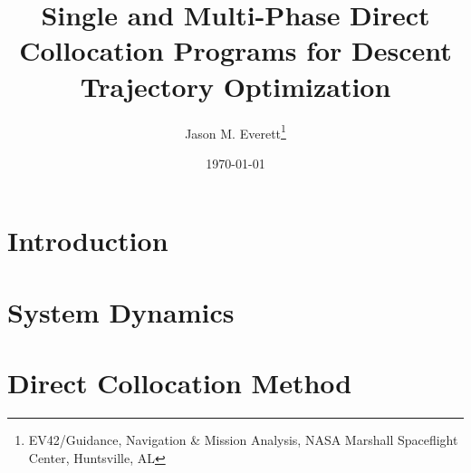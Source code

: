 \documentclass[10pt]{article}
\begin{document}
\title{\textbf{Single and Multi-Phase Direct Collocation Programs for Descent Trajectory Optimization}}
\author{Jason M. Everett\thanks{EV42/Guidance, Navigation \& Mission Analysis, NASA Marshall Spaceflight Center, Huntsville, AL}}
\date{\printdayoff\today}

\maketitle

\newpage
\tableofcontents

\newpage
\section{Introduction}


\newpage
\section{System Dynamics}


\newpage
\section{Direct Collocation Method}

\end{document}
